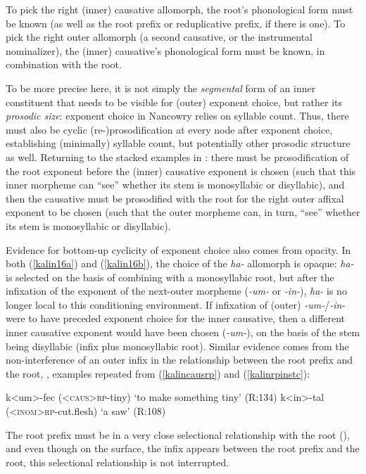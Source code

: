 \documentclass[output=paper]{langscibook}
\begin{document}
\noindent To pick the right (inner) causative allomorph, the root's phonological form must be known (as well as the root prefix or reduplicative prefix, if there is one). To pick the right outer allomorph (a second causative, or the instrumental nominalizer), the (inner) causative's phonological form must be known, in combination with the root.

To be more precise here, it is not simply the \textit{segmental} form of an inner constituent that needs to be visible for (outer) exponent choice, but rather its \textit{prosodic size}: exponent choice in Nancowry relies on syllable count. Thus, there must also be cyclic (re-)prosodification at every node after exponent choice, establishing (minimally) syllable count, but potentially other prosodic structure as well. Returning to the stacked examples in \Last: there must be prosodification of the root exponent before the (inner) causative exponent is chosen (such that this inner morpheme can ``see'' whether its stem is monosyllabic or disyllabic), and then the causative must be prosodified with the root for the right outer affixal exponent to be chosen (such that the outer morpheme can, in turn, ``see'' whether its stem is monosyllabic or disyllabic). 

Evidence for bottom-up cyclicity of exponent choice also comes from opacity. In both (\ref{kalin16a}) and (\ref{kalin16b}), the choice of the \textit{ha-} allomorph is opaque: \textit{ha-} is selected on the basis of combining with a monosyllabic root, but after the infixation of the exponent of the next-outer morpheme (\textit{-um-} or \textit{-in-}), \textit{ha-} is no longer local to this conditioning environment. If infixation of (outer)  \textit{-um-}/\textit{-in-} were to have preceded exponent choice for the inner causative, then a different inner causative exponent would have been chosen (\textit{-um-}), on the basis of the stem being disyllabic (infix plus monosyllabic root). Similar evidence comes from the non-interference of an outer infix in the relationship between the root prefix and the root, \Next, examples repeated from (\ref{kalincausrp}) and (\ref{kalinrpinstc}):

\ea \label{kalin17}
\ea k<um>-fec (\textsc{<caus>}\textsc{rp-}tiny) \hfill  `to make something tiny'  (R:134)\label{kalin17a}
\ex k<in>-tal (\textsc{<inom>rp-}cut.flesh) \hfill `a saw' (R:108)\label{kalin17b}
\z
\z

\noindent The root prefix must be in a very close selectional relationship with the root (), and even though on the surface, the infix appears between the root prefix and the root, this selectional relationship is not interrupted. 
\end{document}
